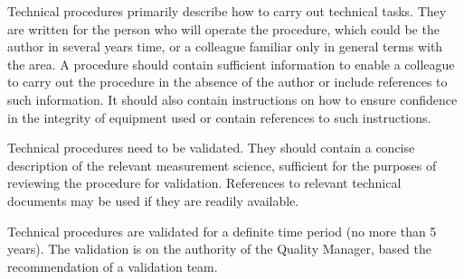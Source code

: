 Technical procedures primarily describe how to carry out technical tasks. They are written for the person who will operate the procedure, which could be the author in several years time, or a colleague familiar only in general terms with the area. A procedure should contain sufficient information to enable a colleague to carry out the procedure in the absence of the author or include references to such information. It should also contain instructions on how to ensure confidence in the integrity of equipment used or contain references to such instructions.

Technical procedures need to be validated. They should contain a concise description of the relevant measurement science, sufficient for the purposes of reviewing the procedure for validation. References to relevant technical documents may be used if they are readily available. 

Technical procedures are validated for a definite time period (no more than 5 years). The validation is on the authority of the Quality Manager, based the recommendation of a validation team. 

